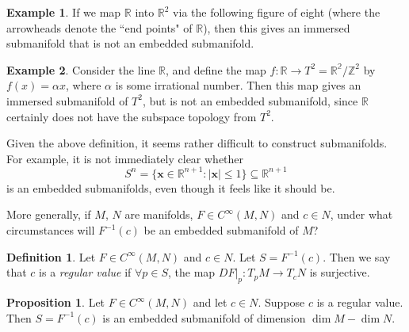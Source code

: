\documentclass[a4paper,11pt]{article}
\theoremstyle{definition}
\newtheorem*{defn}{Definition}
\newtheorem*{prop}{Proposition}
\newtheorem*{ex}{Example}
\numberwithin{equation}{section}
\begin{document}
\begin{ex}
If we map $\mathbb{R}$ into $\mathbb{R}^2$ via the following figure of eight (where the arrowheads denote the ``end points" of $\mathbb{R}$), then this gives an immersed submanifold that is not an embedded submanifold.
\begin{center}
\end{center}
\end{ex}

\begin{ex}
Consider the line $\mathbb{R}$, and define the map $f:\mathbb{R}\rightarrow T^2=\mathbb{R^2}/\mathbb{Z}^2$ by $f(x)=\alpha x$, where $\alpha$ is some irrational number. Then this map gives an immersed submanifold of $T^2$, but is not an embedded submanifold, since $\mathbb{R}$ certainly does not have the subspace topology from $T^2$.
\end{ex}

Given the above definition, it seems rather difficult to construct submanifolds. For example, it is not immediately clear whether 
\[
S^n=\{\mathbf{x}\in\mathbb{R}^{n+1}:|\mathbf{x}|\leq1\}\subseteq\mathbb{R}^{n+1}
\]
is an embedded submanifolds, even though it feels like it should be.

More generally, if $M$, $N$ are manifolds, $F\in C^\infty(M,N)$ and $c\in N$, under what circumstances will $F^{-1}(c)$ be an embedded submanifold of $M$?

\begin{defn}
Let $F\in C^\infty(M,N)$ and $c\in N$. Let $S=F^{-1}(c)$. Then we say that $c$ is a \emph{regular value} if $\forall p\in S$, the map $DF|_p:T_pM\rightarrow T_cN$ is surjective.
\end{defn}

\begin{prop}
Let $F\in C^\infty(M,N)$ and let $c\in N$. Suppose $c$ is a regular value. Then $S=F^{-1}(c)$ is an embedded submanifold of dimension $\dim M-\dim N$.
\end{prop}
\end{document}
